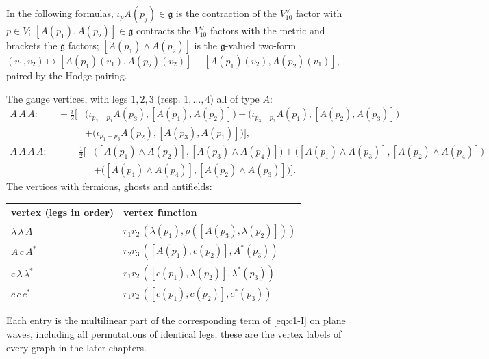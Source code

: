 In the following formulas, $\iota_pA(p_j)\in\mathfrak g$ is the contraction of the $V_{10}^\vee$ factor with $p\in V$; $[A(p_1),A(p_2)]\in\mathfrak g$ contracts the $V_{10}^\vee$ factors with the metric and brackets the $\mathfrak g$ factors; $[A(p_1)\wedge A(p_2)]$ is the $\mathfrak g$-valued two-form $(v_1,v_2)\mapsto[A(p_1)(v_1),A(p_2)(v_2)]-[A(p_1)(v_2),A(p_2)(v_1)]$, paired by the Hodge pairing.

The gauge vertices, with legs $1,2,3$ (resp. $1,\dots,4$) all of type $A$:
\begin{equation}
\begin{aligned}
A\,A\,A:\qquad -\frac i2\Big[&\big(\iota_{p_2-p_1}A(p_3),[A(p_1),A(p_2)]\big)+\big(\iota_{p_3-p_2}A(p_1),[A(p_2),A(p_3)]\big)\\
&+\big(\iota_{p_1-p_3}A(p_2),[A(p_3),A(p_1)]\big)\Big],
\end{aligned}
\label{eq:c1-AAA}
\end{equation}
\begin{equation}
\begin{aligned}
A\,A\,A\,A:\qquad -\frac12\Big[&\big([A(p_1)\wedge A(p_2)],[A(p_3)\wedge A(p_4)]\big)+\big([A(p_1)\wedge A(p_3)],[A(p_2)\wedge A(p_4)]\big)\\
&+\big([A(p_1)\wedge A(p_4)],[A(p_2)\wedge A(p_3)]\big)\Big].
\end{aligned}
\label{eq:c1-AAAA}
\end{equation}
The vertices with fermions, ghosts and antifields:

\begin{tabular}{l|l}
vertex (legs in order) & vertex function \\
\hline
$\lambda\,\lambda\,A$ & $r_1r_2\,(\lambda(p_1),\rho([A(p_3),\lambda(p_2)]))$ \\
$A\,c\,A^*$ & $r_2r_3\,([A(p_1),c(p_2)],A^*(p_3))$ \\
$c\,\lambda\,\lambda^*$ & $r_1r_2\,([c(p_1),\lambda(p_2)],\lambda^*(p_3))$ \\
$c\,c\,c^*$ & $r_1r_2\,([c(p_1),c(p_2)],c^*(p_3))$ \\
\end{tabular}

Each entry is the multilinear part of the corresponding term of \eqref{eq:c1-I} on plane waves, including all permutations of identical legs; these are the vertex labels of every graph in the later chapters.

